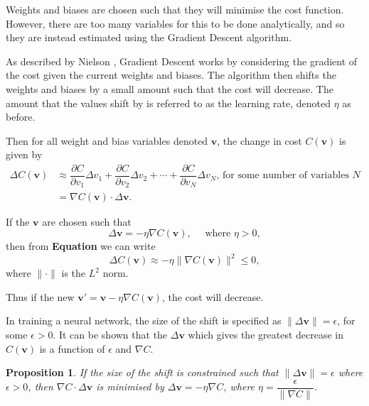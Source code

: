 \documentclass[honours,12pt]{unswthesis}
\newtheorem{proposition}[theorem]{Proposition}
\numberwithin{equation}{section}
\begin{document}
Weights and biases are chosen such that they will minimise the cost function. However, there are too many variables for this to be done analytically, and so they are instead estimated using the Gradient Descent algorithm.

As described by Nielson \cite{Nielson2015}, Gradient Descent works by considering the gradient of the cost given the current weights and biases. The algorithm then shifts the weights and biases by a small amount such that the cost will decrease. The amount that the values shift by is referred to as the learning rate, denoted $\eta$ as before.

Then for all weight and bias variables denoted $\mathbf{v}$, the change in cost $C(\mathbf{v})$ is given by
\begin{align*}
	\Delta C(\mathbf{v}) & \approx \dfrac{\partial C}{\partial v_1}\Delta v_1 + \dfrac{\partial C}{\partial v_2}\Delta v_2 + \cdots + \dfrac{\partial C}{\partial v_N}\Delta v_N\text{, for some number of variables } N\\
	& = \nabla C(\mathbf{v})\cdot \Delta \mathbf{v}.
\end{align*}

If the $\mathbf{v}$ are chosen such that
\[
	\Delta\mathbf{v} = -\eta \nabla C(\mathbf{v}), \quad \text{ where }\eta > 0,
\]
then from \textbf{Equation} we can write
\[
	\Delta C(\mathbf{v}) \approx -\eta \|\nabla C(\mathbf{v})\|^2 \le 0,
\]
where $\|\cdot\|$ is the $L^2$ norm.

Thus if the new $\mathbf{v}' = \mathbf{v} - \eta \nabla C(\mathbf{v})$, the cost will decrease.

In training a neural network, the size of the shift is specified as $\|\Delta\mathbf{v}\| = \epsilon$, for some $\epsilon > 0$. It can be shown that the $\Delta\mathbf{v}$ which gives the greatest decrease in $C(\mathbf{v})$ is a function of $\epsilon$ and $\nabla C$.

\begin{proposition}\label{nnets-graddescminproof}
	If the size of the shift is constrained such that $\|\Delta\mathbf{v}\| = \epsilon$ where $\epsilon > 0$, then $\nabla C \cdot \Delta\mathbf{v}$ is minimised by $\Delta\mathbf{v} = -\eta\nabla C$, where $\eta = \dfrac{\epsilon}{\|\nabla C\|}$.
\end{proposition}
\end{document}
